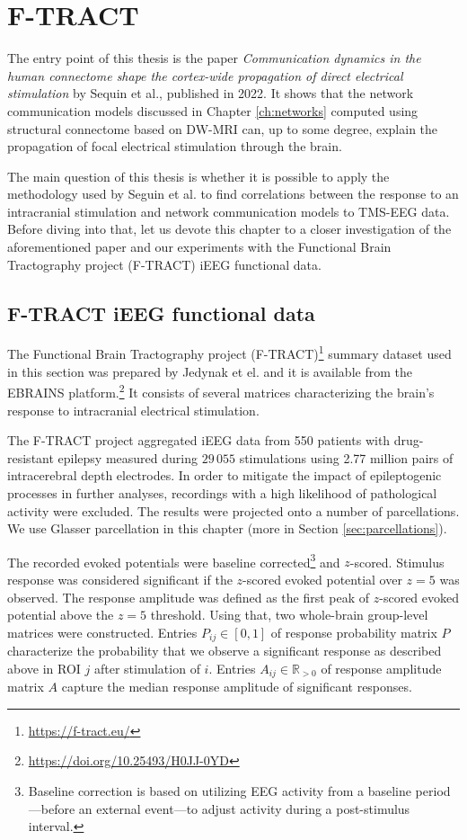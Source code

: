 \chapter{F-TRACT}\label{ch:ftract}

The entry point of this thesis is the paper \textit{Communication dynamics in the human connectome shape the cortex-wide propagation of direct electrical stimulation} by Sequin et al., published in 2022. It shows that the network communication models discussed in Chapter \ref{ch:networks} computed using structural connectome based on DW-MRI can, up to some degree, explain the propagation of focal electrical stimulation through the brain. 

The main question of this thesis is whether it is possible to apply the methodology used by Seguin et al. to find correlations between the response to an intracranial stimulation and network communication models to TMS-EEG data. Before diving into that, let us devote this chapter to a closer investigation of the aforementioned paper and our experiments with the Functional Brain Tractography project (F-TRACT) iEEG functional data.  

\section{F-TRACT iEEG functional data}

The Functional Brain Tractography project (F-TRACT)\footnote{\url{https://f-tract.eu/}} summary dataset used in this section was prepared by Jedynak et el. \cite{jedynak_f-tract_2023} and it is available from the EBRAINS platform.\footnote{\url{https://doi.org/10.25493/H0JJ-0YD}} It consists of several matrices characterizing the brain's response to intracranial electrical stimulation.

The F-TRACT project aggregated iEEG data from 550 patients with drug-resistant epilepsy measured during $29\,055$ stimulations using 2.77 million pairs of intracerebral depth electrodes. In order to mitigate the impact of epileptogenic processes in further analyses, recordings with a high likelihood of pathological activity were excluded. The results were projected onto a number of parcellations. We use Glasser parcellation in this chapter (more in Section \ref{sec:parcellations}). \cite{jedynak_f-tract_2023,seguin_communication_2023} 

The recorded evoked potentials were baseline corrected\footnote{Baseline correction is based on utilizing EEG activity from a baseline period—before an external event—to adjust activity during a post-stimulus interval.} and $z$-scored. Stimulus response was considered significant if the $z$-scored evoked potential over $z = 5$ was observed. The response amplitude was defined as the first peak of $z$-scored evoked potential above the $z = 5$ threshold. Using that, two whole-brain group-level matrices were constructed. Entries $P_{ij} \in [0,1]$ of response probability matrix $P$ characterize the probability that we observe a significant response as described above in ROI $j$ after stimulation of $i$. Entries $A_{ij} \in \mathbb{R}_{>0}$ of response amplitude matrix $A$ capture the median response amplitude of significant responses.

